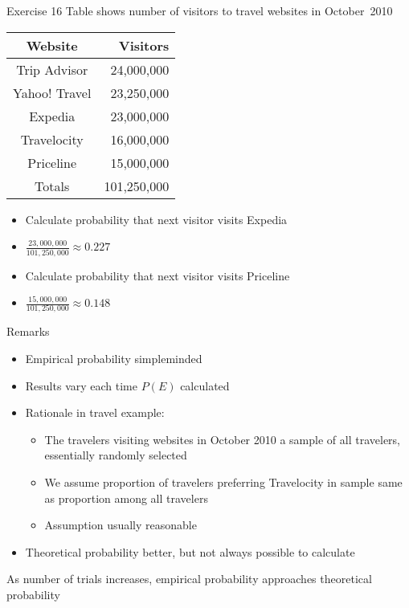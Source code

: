 \documentclass{beamer}
\theoremstyle{definition}
\begin{document}
\begin{frame}{Exercise 16}
Table shows number of visitors to travel websites in October~2010
\begin{center}\begin{tabular}{cr}
Website&Visitors\\\hline
Trip Advisor&24,000,000\\
Yahoo! Travel&23,250,000\\
Expedia&23,000,000\\
Travelocity&16,000,000\\
Priceline&15,000,000\\\hline
Totals&101,250,000
\end{tabular}\end{center}
\begin{itemize}
\item Calculate probability that next visitor visits Expedia
\item $\frac{23,000,000}{101,250,000}\approx 0.227$
\item Calculate probability that next visitor visits Priceline 
\item $\frac{15,000,000}{101,250,000}\approx 0.148$
\end{itemize}
\end{frame}

\begin{frame}{Remarks}
\begin{itemize}
\item Empirical probability simpleminded
\item Results vary each time $P\left(E\right)$ calculated
\item Rationale in travel example:
\begin{itemize}
\item The travelers visiting websites in October 2010 a \alert{sample}
of all travelers, essentially \alert{randomly} selected
\item We assume proportion of travelers preferring Travelocity
in sample same as proportion among all travelers
\item Assumption usually reasonable
\end{itemize}
\item Theoretical probability better, but not always possible to calculate
\end{itemize}
\begin{theorem}
As number of trials increases, empirical probability
approaches theoretical probability
\end{theorem}
\end{frame}
\end{document}
